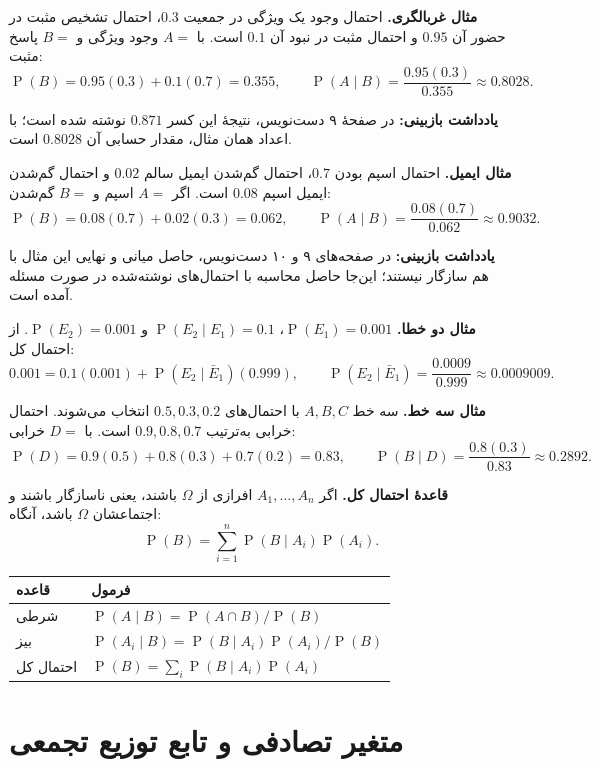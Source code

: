 \documentclass[12pt,a4paper,oneside]{book}
\newcommand{\Prob}{\operatorname{P}}
\newcommand{\NOTE}[1]{\par\smallskip\textbf{یادداشت بازبینی:} #1\par\smallskip}
\begin{document}
\textbf{مثال غربالگری.} احتمال وجود یک ویژگی در جمعیت $0.3$، احتمال تشخیص مثبت در حضور آن $0.95$ و احتمال مثبت در نبود آن $0.1$ است. با $A=$ وجود ویژگی و $B=$ پاسخ مثبت:
\[\Prob(B)=0.95(0.3)+0.1(0.7)=0.355,\qquad
\Prob(A\mid B)=\frac{0.95(0.3)}{0.355}\approx0.8028.\]
\NOTE{در صفحهٔ ۹ دست‌نویس، نتیجهٔ این کسر $0.871$ نوشته شده است؛ با اعداد همان مثال، مقدار حسابی آن $0.8028$ است.}

\textbf{مثال ایمیل.} احتمال اسپم بودن $0.7$، احتمال گم‌شدن ایمیل سالم $0.02$ و احتمال گم‌شدن ایمیل اسپم $0.08$ است. اگر $A=$ اسپم و $B=$ گم‌شدن:
\[\Prob(B)=0.08(0.7)+0.02(0.3)=0.062,\qquad
\Prob(A\mid B)=\frac{0.08(0.7)}{0.062}\approx0.9032.\]
\NOTE{در صفحه‌های ۹ و ۱۰ دست‌نویس، حاصل میانی و نهایی این مثال با هم سازگار نیستند؛ این‌جا حاصل محاسبه با احتمال‌های نوشته‌شده در صورت مسئله آمده است.}

\textbf{مثال دو خطا.} $\Prob(E_1)=0.001$، $\Prob(E_2\mid E_1)=0.1$ و $\Prob(E_2)=0.001$. از احتمال کل:
\[0.001=0.1(0.001)+\Prob(E_2\mid\bar E_1)(0.999),\qquad
\Prob(E_2\mid\bar E_1)=\frac{0.0009}{0.999}\approx0.0009009.\]

\textbf{مثال سه خط.} سه خط $A,B,C$ با احتمال‌های $0.5,0.3,0.2$ انتخاب می‌شوند. احتمال خرابی به‌ترتیب $0.9,0.8,0.7$ است. با $D=$ خرابی:
\[\Prob(D)=0.9(0.5)+0.8(0.3)+0.7(0.2)=0.83,\qquad
\Prob(B\mid D)=\frac{0.8(0.3)}{0.83}\approx0.2892.\]

\textbf{قاعدهٔ احتمال کل.} اگر $A_1,\ldots,A_n$ افرازی از $\Omega$ باشند، یعنی ناسازگار باشند و اجتماعشان $\Omega$ باشد، آنگاه:
\begin{equation}\label{eq:total}
\Prob(B)=\sum_{i=1}^{n}\Prob(B\mid A_i)\Prob(A_i).
\end{equation}
\begin{center}\small\begin{tabular}{p{35mm}p{96mm}}\toprule
قاعده & فرمول \\ \midrule
شرطی & $\Prob(A\mid B)=\Prob(A\cap B)/\Prob(B)$ \\
بیز & $\Prob(A_i\mid B)=\Prob(B\mid A_i)\Prob(A_i)/\Prob(B)$ \\
احتمال کل & $\Prob(B)=\sum_i\Prob(B\mid A_i)\Prob(A_i)$ \\ \bottomrule
\end{tabular}\end{center}

\chapter{متغیر تصادفی و تابع توزیع تجمعی}
\end{document}
